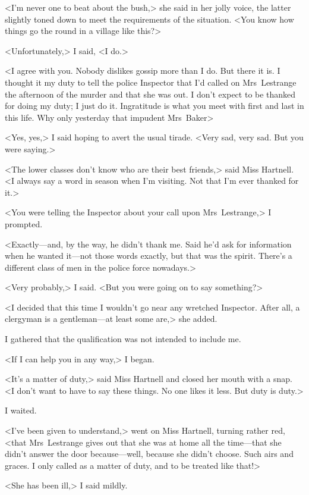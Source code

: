<I'm never one to beat about the bush,> she said in her jolly voice, the latter slightly toned down to meet the requirements of the situation. <You know how things go the round in a village like this?>

<Unfortunately,> I said, <I do.>

<I agree with you. Nobody dislikes gossip more than I do. But there it is. I thought it my duty to tell the police Inspector that I'd called on Mrs~Lestrange the afternoon of the murder and that she was out. I don't expect to be thanked for doing my duty; I just do it. Ingratitude is what you meet with first and last in this life. Why only yesterday that impudent Mrs~Baker\longdash>

<Yes, yes,> I said hoping to avert the usual tirade. <Very sad, very sad. But you were saying.>

<The lower classes don't know who are their best friends,> said Miss Hartnell. <I always say a word in season when I'm visiting. Not that I'm ever thanked for it.>

<You were telling the Inspector about your call upon Mrs~Lestrange,> I prompted.

<Exactly—and, by the way, he didn't thank me. Said he'd ask for information when he wanted it—not those words exactly, but that was the spirit. There's a different class of men in the police force nowadays.>

<Very probably,> I said. <But you were going on to say something?>

<I decided that this time I wouldn't go near any wretched Inspector. After all, a clergyman is a gentleman—at least some are,> she added.

I gathered that the qualification was not intended to include me.

<If I can help you in any way,> I began.

<It's a matter of duty,> said Miss Hartnell and closed her mouth with a snap. <I don't want to have to say these things. No one likes it less. But duty is duty.>

I waited.

<I've been given to understand,> went on Miss Hartnell, turning rather red, <that Mrs~Lestrange gives out that she was at home all the time—that she didn't answer the door because—well, because she didn't choose. Such airs and graces. I only called as a matter of duty, and to be treated like that!>

<She has been ill,> I said mildly.


